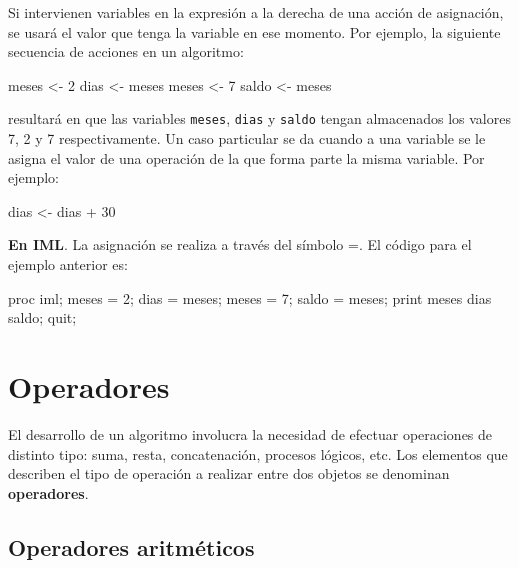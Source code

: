 \documentclass[
]{book}
\newenvironment{Shaded}{\begin{snugshade}}{\end{snugshade}}
\newcommand{\NormalTok}[1]{#1}
\begin{document}
Si intervienen variables en la expresión a la derecha de una acción de asignación, se usará el valor que tenga la variable en ese momento. Por ejemplo, la siguiente secuencia de acciones en un algoritmo:

\begin{Shaded}
\begin{Highlighting}[]
\NormalTok{meses \textless{}{-} 2}
\NormalTok{dias \textless{}{-} meses}
\NormalTok{meses \textless{}{-} 7}
\NormalTok{saldo \textless{}{-} meses}
\end{Highlighting}
\end{Shaded}

resultará en que las variables \texttt{meses}, \texttt{dias} y \texttt{saldo} tengan almacenados los valores 7, 2 y 7 respectivamente. Un caso particular se da cuando a una variable se le asigna el valor de una operación de la que forma parte la misma variable. Por ejemplo:

\begin{Shaded}
\begin{Highlighting}[]
\NormalTok{dias \textless{}{-} dias + 30}
\end{Highlighting}
\end{Shaded}

\textbf{En IML}. La asignación se realiza a través del símbolo =. El código para el ejemplo anterior es:

\begin{Shaded}
\begin{Highlighting}[]
\NormalTok{proc iml;}
\NormalTok{    meses = 2;}
\NormalTok{    dias = meses;}
\NormalTok{    meses = 7;}
\NormalTok{    saldo = meses;}
\NormalTok{    print meses dias saldo;}
\NormalTok{quit;}
\end{Highlighting}
\end{Shaded}

\hypertarget{operadores}{%
\section{Operadores}\label{operadores}}

El desarrollo de un algoritmo involucra la necesidad de efectuar operaciones de distinto tipo: suma, resta, concatenación, procesos lógicos, etc. Los elementos que describen el tipo de operación a realizar entre dos objetos se denominan \textbf{operadores}.

\hypertarget{operadores-aritmuxe9ticos}{%
\subsection{Operadores aritméticos}\label{operadores-aritmuxe9ticos}}
\end{document}
